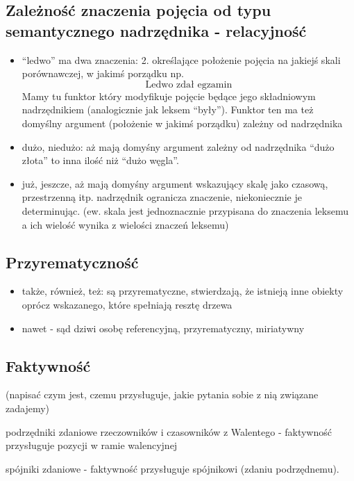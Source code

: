 \documentclass[a4paper, 12pt]{article}
\theoremstyle{remark}
\begin{document}
\subsection{Zależność znaczenia pojęcia od typu semantycznego nadrzędnika - relacyjność}
\begin{itemize}
\item ``ledwo'' ma dwa znaczenia:
2. określające położenie pojęcia na jakiejś skali porównawczej, w jakimś porządku np.
\begin{equation}
	\text{Ledwo zdał egzamin}
\end{equation}
Mamy tu funktor który modyfikuje pojęcie będące jego składniowym nadrzędnikiem (analogicznie jak leksem ``były'').
Funktor ten ma też domyślny argument (położenie w jakimś porządku) zależny od nadrzędnika
\item dużo, niedużo: aż mają domyśny argument zależny od nadrzędnika
``dużo złota'' to inna ilość niż ``dużo węgla''.
\item już, jeszcze, aż mają domyśny argument wskazujący skalę jako czasową, przestrzenną itp.
nadrzędnik  ogranicza znaczenie, niekoniecznie je determinując. (ew. skala jest jednoznacznie przypisana do znaczenia leksemu
a ich wielość wynika z wielości znaczeń leksemu)

\end{itemize}

\subsection{Przyrematyczność}
\begin{itemize}
\item także, również, też: są przyrematyczne, stwierdzają, że istnieją inne obiekty oprócz wskazanego, które spełniają resztę drzewa
\item nawet - sąd dziwi osobę referencyjną, przyrematyczny, miriatywny

\end{itemize}

\subsection{Faktywność} %
(napisać czym jest, czemu przysługuje, jakie pytania sobie z nią związane zadajemy)

podrzędniki zdaniowe rzeczowników i czasowników z Walentego - faktywność przysługuje pozycji w ramie walencyjnej

spójniki zdaniowe - faktywność przysługuje spójnikowi (zdaniu podrzędnemu). 
\end{document}
